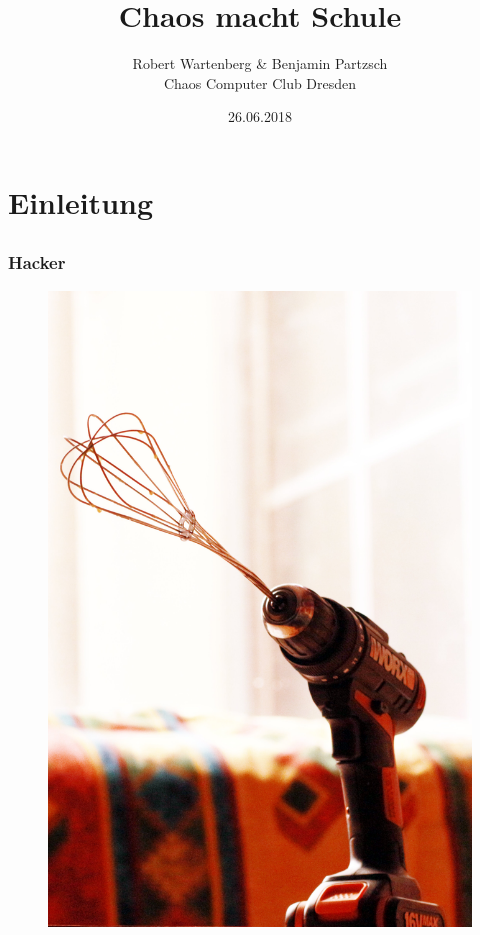 \documentclass[12pt]{beamer}
\title{Chaos macht Schule}
\author{\small Robert Wartenberg \& Benjamin Partzsch\\\large Chaos Computer Club Dresden}
\date{26.06.2018}
\begin{document}
\maketitle

\section{Einleitung}
\subsection{}

\begin{frame}
	\frametitle{Hacker}
	\begin{figure}
	  \includegraphics[height=0.7\textheight]{img/schneeschrauber.jpg}
	\end{figure}
  \end{frame}  
\end{document}

